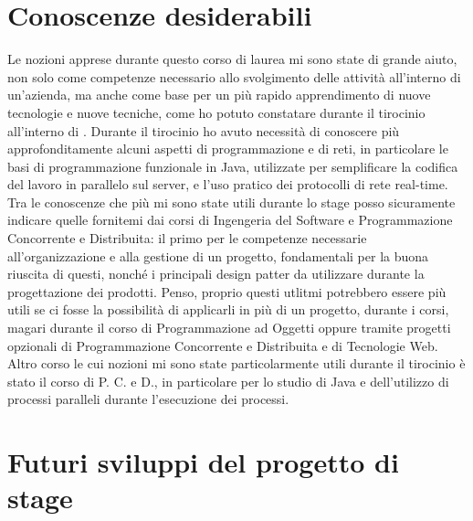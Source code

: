\section{Conoscenze desiderabili}
Le nozioni apprese durante questo corso di laurea mi sono state di grande aiuto, non solo come competenze necessario allo svolgimento delle attività all'interno di un'azienda, ma anche come base per un più rapido apprendimento di nuove tecnologie e nuove tecniche, come ho potuto constatare durante il tirocinio all'interno di \nomeAzienda{}. Durante il tirocinio ho avuto necessità di conoscere più approfonditamente alcuni aspetti di programmazione e di reti, in particolare le basi di programmazione funzionale in Java, utilizzate per semplificare la codifica del lavoro in parallelo sul server, e l'uso pratico dei protocolli di rete real-time.
\\
Tra le conoscenze che più mi sono state utili durante lo stage posso sicuramente indicare quelle fornitemi dai corsi di Ingengeria del Software e Programmazione Concorrente e Distribuita: il primo per le competenze necessarie all'organizzazione e alla gestione di un progetto, fondamentali per la buona riuscita di questi, nonché i principali design patter da utilizzare durante la progettazione dei prodotti. Penso, proprio questi utlitmi potrebbero essere più utili se ci fosse la possibilità di applicarli in più di un progetto, durante i corsi, magari durante il corso di Programmazione ad Oggetti oppure tramite progetti opzionali di Programmazione Concorrente e Distribuita e di Tecnologie Web. Altro corso le cui nozioni mi sono state particolarmente utili durante il tirocinio è stato il corso di P. C. e D., in particolare per lo studio di Java e dell'utilizzo di processi paralleli durante l'esecuzione dei processi. 

\section{Futuri sviluppi del progetto di stage}
